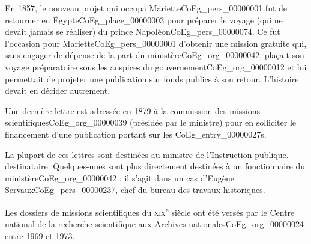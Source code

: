 \documentclass{book}
\begin{document}
\par En 1857, le nouveau projet qui occupa Mariette\gls{CoEg_pers_00000001} fut de retourner en Égypte\gls{CoEg_place_00000003} pour préparer le voyage (qui ne devait jamais se réaliser) du prince Napoléon\gls{CoEg_pers_00000074}. Ce fut l'occasion pour Mariette\gls{CoEg_pers_00000001} d'obtenir une mission gratuite qui, sans engager de dépense de la part du ministère\gls{CoEg_org_00000042}, plaçait son voyage préparatoire sous les auspices du gouvernement\gls{CoEg_org_00000012} et lui permettait de projeter une publication sur fonds publics à son retour. L'histoire devait en décider autrement.
\par Une dernière lettre est adressée en 1879 à la commission des missions scientifiques\gls{CoEg_org_00000039} (présidée par le ministre) pour en solliciter le financement d'une publication portant sur les \glspl{CoEg_entry_00000027}.
\par La plupart de ces lettres sont destinées au ministre de l'Instruction publique. destinataire. Quelques-unes sont plus directement destinées à un fonctionnaire du ministère\gls{CoEg_org_00000042} ; il s'agit dans un cas d'Eugène Servaux\gls{CoEg_pers_00000237}, chef du bureau des travaux historiques.
\par Les dossiers de missions scientifiques du \textsc{xix}\textsuperscript{e} siècle ont été versés par le Centre national de la recherche scientifique aux Archives nationales\gls{CoEg_org_00000024} entre 1969 et 1973.

\hypertarget{CoEg_Mariette_ms_001}{}
\end{document}
